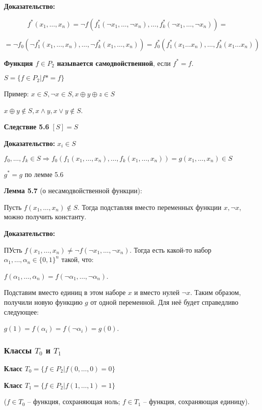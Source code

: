 \documentclass[openany]{article}
\begin{document}
   \textbf{Доказательство:}

   $$f^*(x_1,\ldots,x_n) = \neg f(f_1^*(\neg x_1, \ldots, \neg x_n), \ldots, f_k^*(\neg x_1, \ldots, \neg x_n)) = $$

   $$= \neg f_0(\neg f_1^*(x_1, \ldots, x_n), \ldots, \neg f_k^*(x_1, \ldots, x_n)) = f_0^*(f_1^*(x_1 \ldots x_n), \ldots, f_k^*(x_1 \ldots x_n))$$

   \textbf{Функция $f \in P_2$ называется самодвойственной}, если $f^* = f$.

   $S = \{f \in P_2 | f* = f\}$

   Пример: $x \in S, \neg x \in S, x \oplus y \oplus z \in S$

   $x \oplus y \notin S, x \wedge y, x \vee y \notin S$.

   \textbf{Следствие 5.6} $[S] = S$

   \textbf{Доказательство:} $x_i \in S$

   $f_0,\ldots,f_k \in S \Rightarrow f_0(f_1(x_1,\ldots,x_n),\ldots,f_k(x_1,\ldots,x_n)) = g(x_1,\ldots,x_n) \in S$

   $g^* = g$ по лемме 5.6

   \textbf{Лемма 5.7} (о несамодвойственной функции):

   Пусть $f(x_1, \ldots, x_n) \notin S$. Тогда подставляя вместо переменных функции $x, \neg x$, можно получить константу.

   \textbf{Доказательство:}

   ПУсть $f(x_1,\ldots,x_n) \neq \neg f(\neg x_1, \ldots, \neg x_n)$. Тогда есть какой-то набор $\alpha_1, \ldots, \alpha_n \in \{0, 1\}^n$ такой, что:

   $f(\alpha_1, \ldots, \alpha_n) = f(\neg \alpha_1, \ldots, \neg \alpha_n)$.

   Подставим вместо единиц в этом наборе $x$ и вместо нулей $\neg x$. Таким образом, получили новую функцию $g$ от одной переменной. Для неё будет справедливо следующее:

   $g(1) = f(\alpha_i) = f(\neg \alpha_i) = g(0)$.

   \subsubsection{Классы $T_0$ и $T_1$}

   \textbf{Класс $T_0 = \{f \in P_2 | f(0, \ldots, 0) = 0\}$}

   \textbf{Класс $T_1 = \{f \in P_2 | f(1, \ldots, 1) = 1\}$}

   ($f \in T_0$ -- функция, сохраняющая ноль; $f \in T_1$ -- функция, сохраняющая единицу).
\end{document}
